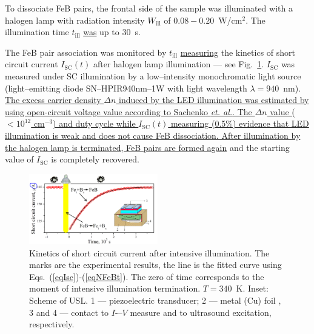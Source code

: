 \documentclass[%
 aip,jap,
 amsmath,amssymb,
 reprint,%
]{revtex4-1}
\begin{document}
To dissociate FeB pairs, the frontal side of the sample was illuminated with a halogen lamp with radiation intensity $W_\mathrm{ill}$ of $0.08-0.20$~W/cm$^2$.
The illumination time $t_\mathrm{ill}$ \textcolor[rgb]{0.00,0.07,1.00}{\uline{was}} up to 30~s.


The FeB pair association was monitored by $t_\mathrm{ill}$ \textcolor[rgb]{0.00,0.07,1.00}{\uline{measuring}} the kinetics of
short circuit current $I_\mathrm{SC}(t)$ after halogen lamp illumination –-- see Fig.~\ref{Fig:Method}.
$I_\mathrm{SC}$ was measured under SC illumination by a low--intensity monochromatic light source (light--emitting diode SN--HPIR940nm--1W with light wavelength $\lambda=940$~nm).
\textcolor[rgb]{0.00,0.07,1.00}{\uline{
The excess carrier density $\Delta n$ induced by the LED illumination
was estimated by using open-circuit voltage value according to Sachenko \emph{et. al.}\cite{JAPSach}.
The $\Delta n$ value ($<10^{12}$ cm$^{-3}$) and duty cycle while $I_\mathrm{SC}(t)$ measuring (0.5\%)
evidence that LED illumination is weak and does not cause FeB dissociation.
After  illumination by the halogen lamp is terminated,
FeB pairs are formed again}}
and the starting value of $I_\mathrm{SC}$ is completely recovered.


\begin{figure}
\includegraphics[width=0.5\textwidth]{Fig2}%
\caption{\label{Fig:Method}
Kinetics of short circuit current after intensive illumination.
The marks are the experimental results,
the line is the fitted curve using Eqs.~(\ref{eqIsc})-(\ref{eqNFeBt}).
The zero of time corresponds to the moment of intensive illumination termination.
$T=340$~K.
Inset: Scheme of USL.
1 –-- piezoelectric transducer;
2 –-- metal (Cu) foil ,
3 and 4 --- contact to $I$-–$V$ measure and to ultrasound excitation, respectively.
}
\end{figure}
\end{document}
